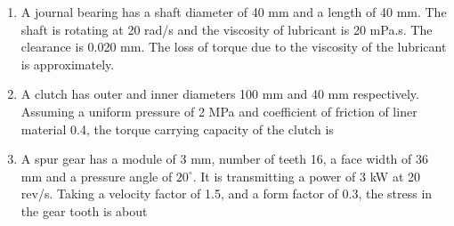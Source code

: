 \documentclass[journal,12pt,onecolumn]{IEEEtran}
\begin{document}
\begin{enumerate}[resume]
    \item A journal bearing has a shaft diameter of 40 mm and a length of 40 mm. The shaft is rotating at 20 rad/s and the viscosity of lubricant is 20 mPa.s. The clearance is 0.020 mm. The loss of torque due to the viscosity of the lubricant is approximately.
          \begin{enumerate}
          \end{enumerate}

    \item A clutch has outer and inner diameters 100 mm and 40 mm respectively. Assuming a uniform pressure of 2 MPa and coefficient of friction of liner material 0.4, the torque carrying capacity of the clutch is
          \begin{enumerate}
          \end{enumerate}

    \item A spur gear has a module of 3 mm, number of teeth 16, a face width of 36 mm and a pressure angle of $20^\circ$. It is transmitting a power of 3 kW at 20 rev/s. Taking a velocity factor of 1.5, and a form factor of 0.3, the stress in the gear tooth is about
          \begin{enumerate}
          \end{enumerate}


\end{enumerate}
\end{document}
